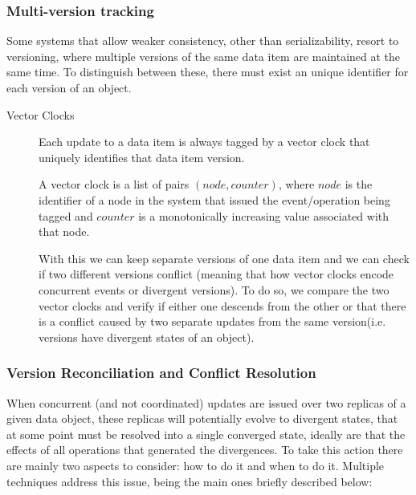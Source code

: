 
\subsubsection{Multi-version tracking}
\label{sec:versioning}
Some systems that allow weaker consistency, other than serializability, resort to versioning, where multiple versions of the same data item are maintained at the same time. To distinguish between these, there must exist an unique identifier for each version of an object.

\begin{description}
\item[Vector Clocks] Each update to a data item is always tagged by a vector clock that uniquely identifies that data item version.\par
	A vector clock is a list of pairs $(node, counter)$, where $node$ is the identifier of a node in the system that issued the event/operation being tagged and $counter$ is a monotonically increasing value associated with that node.\par
	With this we can keep separate versions of one data item and we can check if two different versions conflict (meaning that how vector clocks encode concurrent events or divergent versions). To do so, we compare the two vector clocks and verify if either one descends from the other or that there is a conflict caused by two separate updates from the same version(i.e. versions have divergent states of an object).
\end{description}

\subsubsection{Version Reconciliation and Conflict Resolution}
\label{sec:conflict_resolution}

When concurrent (and not coordinated) updates are issued over two replicas of a given data object, these replicas will potentially evolve to divergent states, that at some point must be resolved into a single converged state, ideally are that the effects of all operations that generated the divergences. To take this action there are mainly two aspects to consider: how to do it and when to do it. Multiple techniques address this issue, being the main ones briefly described below:

